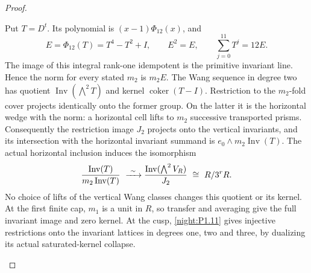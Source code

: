 \begin{proof}
\begin{enumerate}[label=\arabic*.]
Put $T=D^t$.  Its polynomial is $(x-1)\Phi_{12}(x)$, and
\[
 E=\Phi_{12}(T)=T^4-T^2+I,\qquad E^2=E,\qquad
 \sum_{j=0}^{11}T^j=12E.
\]
The image of this integral rank-one idempotent is the primitive
invariant line.  Hence the norm for every stated $m_2$ is $m_2E$.
The Wang sequence in degree two has quotient
$\operatorname{Inv}(\bigwedge^2T)$ and kernel
$\operatorname{coker}(T-I)$.  Restriction to the $m_2$-fold cover
projects identically onto the former group.  On the latter it is
the horizontal wedge with the norm: a horizontal cell lifts to
$m_2$ successive transported prisms.
Consequently the restriction image $J_2$ projects onto the vertical
invariants, and its intersection with the horizontal invariant
summand is $e_0\wedge m_2\operatorname{Inv}(T)$.
The actual horizontal inclusion induces the isomorphism
\[
 \frac{\operatorname{Inv}(T)}{m_2\operatorname{Inv}(T)}
 \ \xrightarrow{\ \sim\ }\\
 \frac{\operatorname{Inv}(\bigwedge^2V_R)}{J_2}
 \ \cong\ R/3^rR.
\]
No choice of lifts of the vertical Wang classes changes this
quotient or its kernel.  At the first finite cap, $m_1$ is a unit
in $R$, so transfer and averaging give the full invariant image
and zero kernel.  At the cusp, \cref{night:P1.11} gives injective
restrictions onto the invariant lattices in degrees one, two
and three, by dualizing its actual saturated-kernel collapse.


\end{enumerate}
\end{proof}
